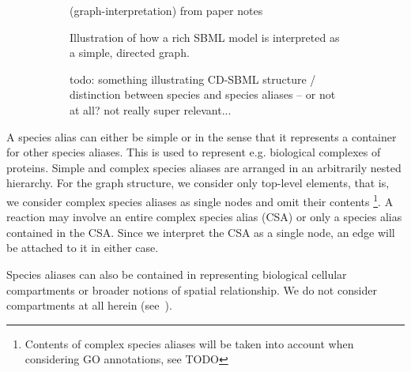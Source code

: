 \documentclass[
	fontsize=10pt, %
	twoside=false, %
	secnumdepth=1, %
]{kaobook}
\begin{document}
\begin{figure}[h]
  \centering
  \begin{subfigure}{0.45\linewidth}
    (graph-interpretation) from paper notes
    \caption{Illustration of how a rich SBML model is interpreted as a simple,
      directed graph.}
  \end{subfigure}
  \begin{subfigure}{0.45\linewidth}
    todo: something illustrating CD-SBML structure / distinction between species
    and species aliases -- or not at all? not really super relevant...
  \end{subfigure}
  \label{fig:graph-interpretation}
\end{figure}


A species alias can either be simple or  in the sense that it
represents a container for other species aliases. This is used to represent e.g.
biological complexes of proteins. Simple and complex species aliases are
arranged in an arbitrarily nested hierarchy. For the graph structure, we
consider only top-level elements, that is, we consider complex species aliases
as single nodes and omit their contents \footnote{ Contents of complex species
  aliases will be taken into account when considering GO annotations, see TODO
}. A reaction may involve an entire complex species alias (CSA) or only a
species alias contained in the CSA. Since we interpret the CSA as a single node,
an edge will be attached to it in either case.

Species aliases can also be contained in  representing
biological cellular compartments or broader notions of spatial relationship. We
do not consider compartments at all herein (see~).


\end{document}
